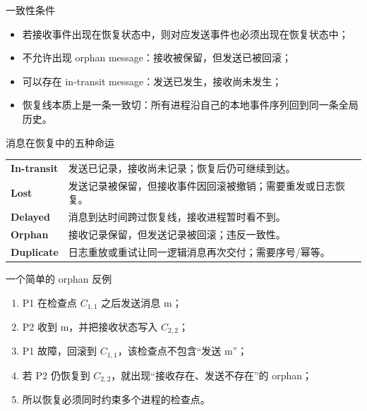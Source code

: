 \documentclass[UTF8,fontset=none,aspectratio=169,10pt]{beamer}
\begin{document}
\begin{frame}{一致性条件}
\begin{itemize}
  \item 若接收事件出现在恢复状态中，则对应发送事件也必须出现在恢复状态中；
  \item 不允许出现 orphan message：接收被保留，但发送已被回滚；
  \item 可以存在 in-transit message：发送已发生，接收尚未发生；
  \item 恢复线本质上是一条一致切：所有进程沿自己的本地事件序列回到同一条全局历史。
\end{itemize}
\vfill
{}
\end{frame}

\begin{frame}{消息在恢复中的五种命运}
\begin{tabularx}{\linewidth}{>{\bfseries}p{2.6cm}X}
\toprule
In-transit & 发送已记录，接收尚未记录；恢复后仍可继续到达。 \\
Lost & 发送记录被保留，但接收事件因回滚被撤销；需要重发或日志恢复。 \\
Delayed & 消息到达时间跨过恢复线，接收进程暂时看不到。 \\
Orphan & 接收记录保留，但发送记录被回滚；违反一致性。 \\
Duplicate & 日志重放或重试让同一逻辑消息再次交付；需要序号/幂等。 \\
\bottomrule
\end{tabularx}
\end{frame}

\begin{frame}{一个简单的 orphan 反例}
\begin{enumerate}
  \item P1 在检查点 $C_{1,1}$ 之后发送消息 m；
  \item P2 收到 m，并把接收状态写入 $C_{2,2}$；
  \item P1 故障，回滚到 $C_{1,1}$，该检查点不包含“发送 m”；
  \item 若 P2 仍恢复到 $C_{2,2}$，就出现“接收存在、发送不存在”的 orphan；
  \item 所以恢复必须同时约束多个进程的检查点。
\end{enumerate}
\end{frame}

\end{document}
